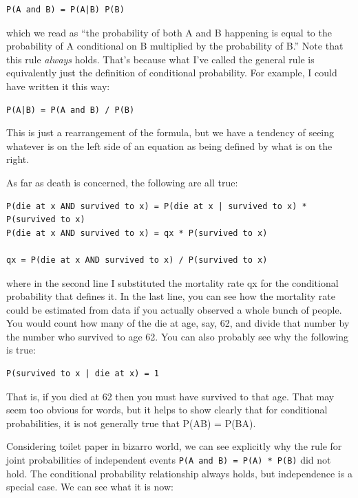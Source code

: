 \documentclass[openany]{book}
\begin{document}
\begin{verbatim}
P(A and B) = P(A|B) P(B)
\end{verbatim}

which we read as ``the probability of both A and B happening is equal to the probability of A conditional on B multiplied by the probability of B.'' Note that this rule \emph{always} holds. That's because what I've called the general rule is equivalently just the definition of conditional probability. For example, I could have written it this way:

\begin{verbatim}
P(A|B) = P(A and B) / P(B)
\end{verbatim}

This is just a rearrangement of the formula, but we have a tendency of seeing whatever is on the left side of an equation as being defined by what is on the right.

As far as death is concerned, the following are all true:

\begin{verbatim}
P(die at x AND survived to x) = P(die at x | survived to x) * P(survived to x)
P(die at x AND survived to x) = qx * P(survived to x)

qx = P(die at x AND survived to x) / P(survived to x)
\end{verbatim}

where in the second line I substituted the mortality rate qx for the conditional probability that defines it. In the last line, you can see how the mortality rate could be estimated from data if you actually observed a whole bunch of people. You would count how many of the die at age, say, 62, and divide that number by the number who survived to age 62. You can also probably see why the following is true:

\begin{verbatim}
P(survived to x | die at x) = 1
\end{verbatim}

That is, if you died at 62 then you must have survived to that age. That may seem too obvious for words, but it helps to show clearly that for conditional probabilities, it is not generally true that P(A\textbar{}B) = P(B\textbar{}A).

Considering toilet paper in bizarro world, we can see explicitly why the rule for joint probabilities of independent events \texttt{P(A\ and\ B)\ =\ P(A)\ *\ P(B)} did not hold. The conditional probability relationship always holds, but independence is a special case. We can see what it is now:
\end{document}
